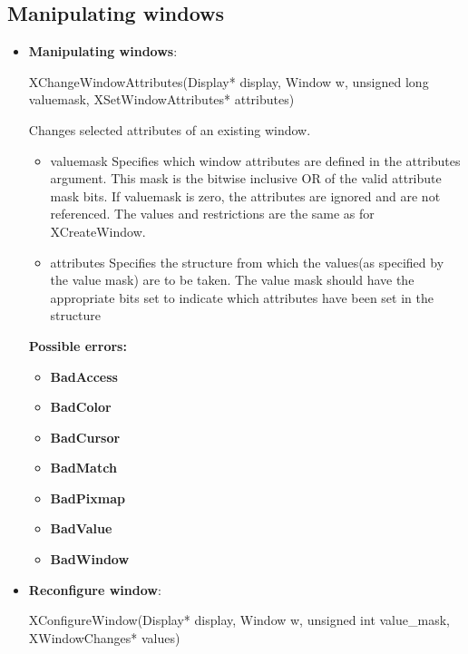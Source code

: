 \documentclass{report}
\begin{document}
    \pagebreak 
    \subsection{Manipulating windows} 
    \begin{itemize}
        \item \textbf{Manipulating windows}:
            \begin{cppcode}
                XChangeWindowAttributes(Display* display, Window w, unsigned long valuemask, XSetWindowAttributes* attributes)
            \end{cppcode}
            \bigbreak \noindent
            Changes selected attributes of an existing window.
            \begin{itemize}
                \item valuemask Specifies which window attributes are defined in the attributes argument. This mask is the bitwise inclusive OR of the valid attribute mask bits. If valuemask is zero, the attributes are ignored and are not referenced. The values and restrictions are the same as for XCreateWindow.
                \item attributes Specifies the structure from which the values(as specified by the value mask) are to be taken. The value mask should have the appropriate bits set to indicate which attributes have been set in the structure
            \end{itemize}
            \bigbreak \noindent
            \textbf{Possible errors:}
            \begin{itemize}
                \item \textbf{BadAccess}
                \item \textbf{BadColor}
                \item \textbf{BadCursor}
                \item \textbf{BadMatch}
                \item \textbf{BadPixmap}
                \item \textbf{BadValue}
                \item \textbf{BadWindow}
            \end{itemize}
        \item \textbf{Reconfigure window}:
            \bigbreak \noindent 
            \begin{cppcode}
                XConfigureWindow(Display* display, Window w, unsigned int value_mask, XWindowChanges* values)
            \end{cppcode}

\end{itemize}
\end{document}
